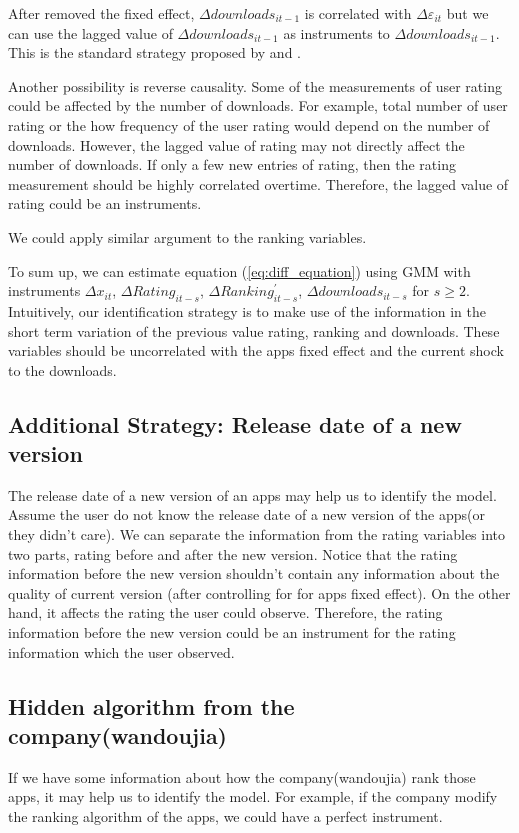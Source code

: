 \documentclass[11pt,twoside]{article}
\begin{document}
	After removed the fixed effect, $\Delta downloads_{it-1}$ is correlated with $\Delta \varepsilon_{it}$ but we can use the lagged value of  $\Delta downloads_{it-1}$ as instruments to $\Delta downloads_{it-1}$. This is the standard strategy proposed by \cite{ArellanoBond1991} and \cite{Holtz-EakinNeweyRosen1988}. 
	
	
	Another possibility is reverse causality. Some of the measurements of user rating could be affected by the number of downloads. For example, total number of user rating or the how frequency of the user rating would depend on the number of downloads. However, the lagged value of rating may not directly affect the number of downloads. If only a few new entries of rating, then the rating measurement should be highly correlated overtime. Therefore, the lagged value of rating could be an instruments. 
	
	We could apply similar argument to the ranking variables. 
	
	To sum up, we can estimate equation (\ref{eq:diff_equation}) using GMM with instruments $\Delta x_{it}$, $\Delta Rating_{it-s} $, $\Delta Ranking_{it-s}^{'} $, $ \Delta downloads_{it-s}$ for $s\geq 2$.
	Intuitively, our identification strategy is to make use of the information in the short term variation of the previous value rating, ranking and downloads. These variables should be uncorrelated with the apps fixed effect and the current shock to the downloads.
	
\subsection{Additional Strategy: Release date of a new version}
The release date of a new version of an apps may help us to identify the model. Assume the user do not know the release date of a new version of the apps(or they didn't care). We can separate the information from the rating variables into two parts, rating before and after the new version. Notice that the rating information before the new version shouldn't contain any information about the quality of current version (after controlling for for apps fixed effect). On the other hand, it affects the rating the user could observe. Therefore, the rating information before the new version could be an instrument for the rating information which the user observed. 

\subsection{Hidden algorithm from the company(wandoujia)}
If we have some information about how the company(wandoujia) rank those apps, it may help us to identify the model. For example, if the company modify the ranking algorithm of the apps, we could have a perfect instrument. 
\end{document}
